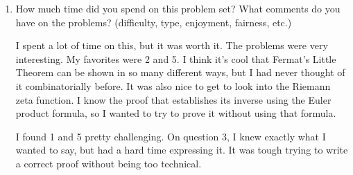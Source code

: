 \documentclass[12pt]{article}
\begin{document}
\begin{enumerate}[leftmargin=0cm,itemindent=.5cm,labelwidth=\itemindent,labelsep=0cm,align=left]

\noindent Finally, define the size of $(S,m_S)$ to be $|S(m)| = \sum\limits_{s \in S} m_S(s)$.

\noindent \emph{Inclusion-Exclusion is the same for multi-sets as it is for sets:}

Let $E_1, \dots , E_n$ be multisets.  Then
$$
\left| \bigcup_{i = 1}^n E_i \right| = \sum_{k=1}^n (-1)^{k+1} \left(\sum_{1 \leq i_1 < \cdots < i_k \leq n} |E_{i_1} \cap \cdots \cap E_{i_k}| \right).
$$



\begin{proof}

\ For each $i$, let $A_i$ be a set (not a multiset) defined by
$$
A_i = \bigcup_{s \in E_i} \{ (s,1), s(s,2), \dots , (s, (m_S(s)) \}.
$$

Any intersection of some collection of the $E_i$ has the same size as the intersection of the corresponding collection of $A_i$, and similarly for any unions.  Therefore, the stated formula simply reduces to the standard inclusion-exclusion formula for sets, applied to the $A_i$.

\end{proof}
\item How much time did you spend on this problem set?  What comments do you have on the problems? (difficulty, type, enjoyment, fairness, etc.)

I spent a lot of time on this, but it was worth it.  The problems were very interesting.  My favorites were 2 and 5.  I think it's cool that Fermat's Little Theorem can be shown in so many different ways, but I had never thought of it combinatorially before.  It was also nice to get to look into the Riemann zeta function.  I know the proof that establishes its inverse using the Euler product formula, so I wanted to try to prove it without using that formula.

I found 1 and 5 pretty challenging.  On question 3, I knew exactly what I wanted to say, but had a hard time expressing it.  It was tough trying to write a correct proof without being too technical.
\end{enumerate}
\end{document}
